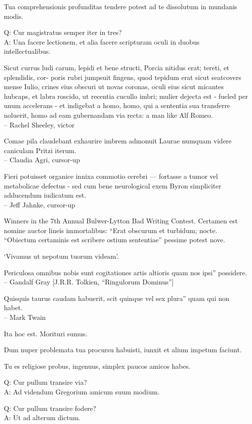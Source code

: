 \documentclass[titlepage,12pt]{memoir}
\begin{document}
Tua comprehensionis profunditas tendere potest ad te dissolutum in mundanis modis.

Q: Cur magistratus semper iter in tres?\\
A: Una facere lectionem, et alia facere scripturam
oculi in duobus intellectualibus.

Sicut currus ludi carum, lepidi et bene structi, Porcia nitidus erat;
tereti, et splendidis, cor- poris rubri jumpsuit fingens, quod tepidum erat
sicut seatcovers mense Iulio, crines eius obscuri ut novas coronas, oculi eius sicut micantes
hubcaps, et labra roscido, ut recentia cucullo imbri;
mulier dejecta est - fueled per unum accelerans - et indigebat a
homo, homo, qui a sententia sua transferre noluerit, homo ad eam gubernandam
via recta: a man like Alf Romeo.
\\-- Rachel Sheeley, victor

Comae pila claudebant exhaurire imbrem admonuit Laurae numquam
videre caniculam Pritzi iterum.
\\-- Claudia Agri, cursor-up

Fieri potuisset organice innixa commotio cerebri — fortasse a
tumor vel metabolicae defectus - sed cum bene neurological exem
Byron simpliciter adducendum iudicatum est.
\\-- Jeff Jahnke, cursor-up

Winners in the 7th Annual Bulwer-Lytton Bad Writing Contest. Certamen est
nomine auctor lineis immortalibus: “Erat obscurum et turbidum;
nocte. “Obiectum certaminis est scribere ostium sententiae”
pessime potest nove.

‘Vivamus ut nepotum tuorum videam’.

Periculosa omnibus nobis sunt cogitationes artis altioris quam nos ipsi”
possidere.
\\-- Gandalf Gray [J.R.R. Tolkien, “Ringulorum Dominus”]

Quisquis taurus caudam habuerit, scit quinque vel sex plura”
quam qui non habet.
\\-- Mark Twain

Ita hoc est. Morituri sumus.

Dum nuper problemata tua procursu habuisti, iunxit et
alium impetum faciunt.

Tu es religiose probus, ingenuus, simplex
paucos amicos habes.

Q: Cur pullum transire via?\\
A: Ad videndum Gregorium amicum suum modium.

Q: Cur pullum transire fodere?\\
A: Ut ad alterum dictum.
\end{document}
